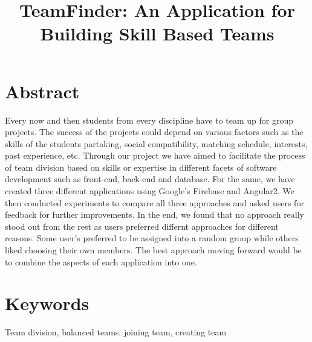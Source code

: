 \documentclass[conference]{IEEEtran}
\begin{document}
\title{TeamFinder: An Application for Building Skill Based Teams}


\author{
}


\maketitle
\section{Abstract}
Every now and then students from every discipline have to team up for group projects. The success of the projects could depend on various factors such as the skills of the students partaking, social compatibility, matching schedule, interests, past experience, etc. Through our project we have aimed to facilitate the process of team division based on skills or expertise in different facets of software development such as front-end, back-end and database. For the same, we have created three different applications using Google's Firebase and Angular2. We then conducted experiments to compare all three approaches and asked users for feedback for further improvements. In the end, we found that no approach really stood out from the rest as users preferred differnt approaches for different reasons. Some user's preferred to be assigned into a random group while others liked choosing their own members. The best approach moving forward would be to combine the aspects of each application into one.       

\section{Keywords}
Team division, balanced teams, joining team, creating team
\end{document}
